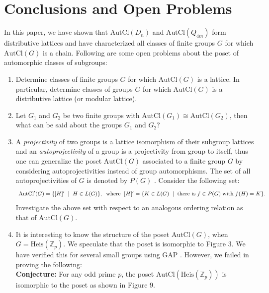 \documentclass{article}
\theoremstyle{definition}
\begin{document}
\section{Conclusions and Open Problems}
In this paper, we have shown that $\text{AutCl}(D_n)$ and $\text{AutCl}(Q_{4m})$ form distributive lattices and have characterized all classes of finite groups $G$ for which $\text{AutCl}(G)$ is a chain. Following are some open problems about the poset of automorphic classes of subgroups:
\begin{enumerate}
    \item Determine classes of finite groups $G$ for which $\text{AutCl}(G)$ is a lattice. In particular, determine classes of groups $G$ for which $\text{AutCl}(G)$ is a distributive lattice (or modular lattice).
    \item Let $G_1$ and $G_2$ be two finite groups with $\text{AutCl}(G_1)\cong \text{AutCl}(G_2)$, then what can be said about the groups $G_1$ and $G_2$?
    \item A \emph{projectivity} of two groups is a lattice isomorphism of their subgroup lattices and an \emph{autoprojectivity} of a group is a projectivity from group to itself, thus one can generalize the poset $\text{AutCl}(G)$ associated to a finite group $G$ by considering autoprojectivities instead of group automorphisms. The set of all autoprojectivities of $G$ is denoted by $P(G)$ \cite{Schmidt+1994}. Consider the following set: \begin{equation*}
        \text{ AutCl}'(G)= \{[H]'\hspace{0.2cm} |\hspace{0.2cm} H\in L(G)\},\hspace{0.2cm} \text{where} \hspace{0.2cm}[H]'=\{K\in L(G)\hspace{0.2cm}|\hspace{0.2cm} \text{there is}\hspace{0.1cm} f\in P(G) \hspace{0.1cm}\text{with}\hspace{0.1cm} f(H)=K\}.
    \end{equation*}
    Investigate the above set with respect to an analogous ordering relation as that of $\text{AutCl}(G)$.
    \item It is interesting to know the structure of the poset $\text{AutCl}(G)$, when $G=\text{Heis}(\mathbb{Z}_p)$. We speculate that the poset is isomorphic to Figure 3. We have verified this for several small groups using GAP \cite{GAP4}. However, we failed in proving the following: \vspace{0.2cm}\\
\textbf{Conjecture:} For any odd prime $p$, the poset $\text{AutCl}(\text{Heis}(\mathbb{Z}_p))$ is isomorphic to the poset as shown in Figure 9.
\end{enumerate}
\end{document}
